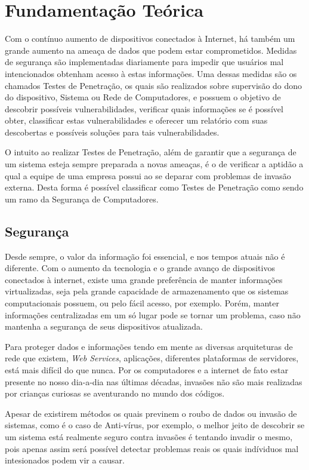 \chapter{Fundamentação Teórica}
\label{c.fundamentacaoteorica}

Com o contínuo aumento de dispositivos conectados à Internet, há também um grande aumento na ameaça de dados que podem estar comprometidos. Medidas de segurança são implementadas diariamente para impedir que usuários mal intencionados obtenham acesso à estas informações. Uma dessas medidas são os chamados Testes de Penetração, os quais são realizados sobre supervisão do dono do dispositivo, Sistema ou Rede de Computadores, e possuem o objetivo de descobrir possíveis vulnerabilidades, verificar quais informações se é possível obter, classificar estas vulnerabilidades e oferecer um relatório com suas descobertas e possíveis soluções para tais vulnerabilidades.

O intuito ao realizar Testes de Penetração, além de garantir que a segurança de um sistema esteja sempre preparada a novas ameaças, é o de verificar a aptidão a qual a equipe de uma empresa possui ao se deparar com problemas de invasão externa. Desta forma é possível classificar como Testes de Penetração como sendo um ramo da Segurança de Computadores.

\section{Segurança}
\label{s.seguranca}

Desde sempre, o valor da informação foi essencial, e nos tempos atuais não é diferente. Com o aumento da tecnologia e o grande avanço de dispositivos conectados à internet, existe uma grande preferência de manter informações virtualizadas, seja pela grande capacidade de armazenamento que os sistemas computacionais possuem, ou pelo fácil acesso, por exemplo. Porém, manter informações centralizadas em um só lugar pode se tornar um problema, caso não mantenha a segurança de seus dispositivos atualizada.

Para proteger dados e informações tendo em mente as diversas arquiteturas de rede que existem, {\em Web Services}, aplicações, diferentes plataformas de servidores, está mais difícil do que nunca. Por os computadores e a internet de fato estar presente no nosso dia-a-dia nas últimas décadas, invasões não são mais realizadas por crianças curiosas se aventurando no mundo dos códigos.

Apesar de existirem métodos os quais previnem o roubo de dados ou invasão de sistemas, como é o caso de Anti-vírus, por exemplo, o melhor jeito de descobrir se um sistema está realmente seguro contra invasões é tentando invadir o mesmo, pois apenas assim será possível detectar problemas reais os quais indíviduos mal intesionados podem vir a causar.

